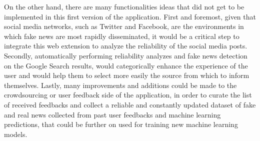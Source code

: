 \documentclass[12pt, a4paper]{article}
\begin{document}
  On the other hand, there are many functionalities ideas that did not get to be implemented in this first version of the application. First and foremost, given that social media networks, such as Twitter and Facebook, are the environments in which fake news are most rapidly disseminated, it would be a critical step to integrate this web extension to analyze the reliability of the social media posts. Secondly, automatically performing reliability analyzes and fake news detection on the Google Search results, would categorically enhance the experience of the user and would help them to select more easily the source from which to inform themselves. Lastly, many improvements and additions could be made to the crowdsourcing or user feedback side of the application, in order to curate the list of received feedbacks and collect a reliable and constantly updated dataset of fake and real news collected from past user feedbacks and machine learning predictions, that could be further on used for training new machine learning models.

  \newpage
  
  
  \nocite{*}
\end{document}
